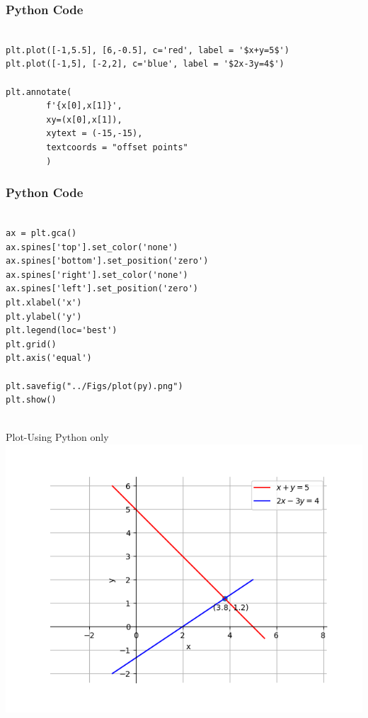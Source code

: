 \documentclass{beamer}
\begin{document}
\begin{frame}[fragile]
    \frametitle{Python Code}
    \begin{lstlisting}

plt.plot([-1,5.5], [6,-0.5], c='red', label = '$x+y=5$')
plt.plot([-1,5], [-2,2], c='blue', label = '$2x-3y=4$')

plt.annotate(
        f'{x[0],x[1]}',
        xy=(x[0],x[1]),
        xytext = (-15,-15),
        textcoords = "offset points"
        )

\end{lstlisting}
\end{frame}

\begin{frame}[fragile]
    \frametitle{Python Code}
    \begin{lstlisting}

ax = plt.gca()
ax.spines['top'].set_color('none')
ax.spines['bottom'].set_position('zero')
ax.spines['right'].set_color('none')
ax.spines['left'].set_position('zero')
plt.xlabel('x')
plt.ylabel('y')
plt.legend(loc='best')
plt.grid()
plt.axis('equal')

plt.savefig("../Figs/plot(py).png")
plt.show()


    \end{lstlisting}
\end{frame}


\begin{frame}{Plot-Using Python only}
    \centering
    \includegraphics[width=\columnwidth, height=0.8\textheight, keepaspectratio]{Figs/plot(py).png}     
\end{frame}
\end{document}
